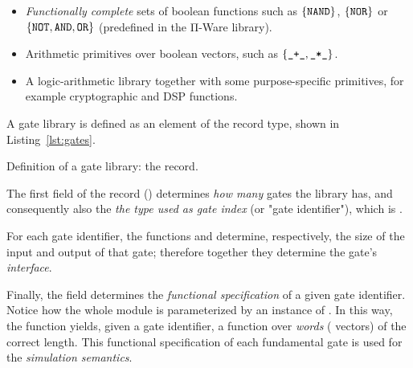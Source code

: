             \begin{itemize}
                \item \emph{Functionally complete} sets of boolean functions such as
                    $\{ \text{\texttt{NAND}} \}$, $\{ \text{\texttt{NOR}} \}$ or
                    $\{ \text{\texttt{NOT}}, \text{\texttt{AND}}, \text{\texttt{OR}} \}$
                    (predefined in the Π-Ware library).
                \item Arithmetic primitives over boolean vectors, such as $\{ \text{\texttt{\_+\_}}, \text{\texttt{\_*\_}} \}$.
                \item A logic-arithmetic library together with some purpose-specific primitives,
                    for example cryptographic and \ac{DSP} functions.
            \end{itemize}

            A gate library is defined as an element of the  record type, shown in Listing~\ref{lst:gates}.

            \begin{listing}[h]
                \newline
                \caption{Definition of a gate library: the  record.\label{lst:gates}}
            \end{listing}

            The first field of the  record () determines \emph{how many}
            gates the library has, and consequently also the \emph{the type used as gate index}
            (or "gate identifier"), which is  \AY{=}  .

            For each gate identifier, the functions  and  determine, respectively,
            the size of the input and output of that gate; therefore together they determine the gate's \emph{interface}.

            Finally, the  field determines the \emph{functional specification} of a given gate identifier.
            Notice how the whole  module is parameterized by an instance of .
            In this way, the  function yields, given a gate identifier, a function over \emph{words}
            ( vectors) of the correct length.
            This functional specification of each fundamental gate is used for the \emph{simulation semantics}.

